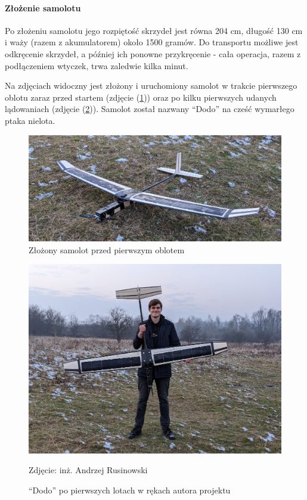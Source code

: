 \documentclass[12pt, a4paper]{article}
\let\oldref\ref
\renewcommand{\ref}[1]{(\oldref{#1})}
\begin{document}
\FloatBarrier
\paragraph{Złożenie samolotu}\mbox{}

Po złożeniu samolotu jego rozpiętość skrzydeł jest równa 204 cm, długość 130 cm i waży (razem z akumulatorem) około 1500 gramów. Do transportu możliwe jest odkręcenie skrzydeł, a później ich ponowne przykręcenie - cała operacja, razem z podłączeniem wtyczek, trwa zaledwie kilka minut. 

Na zdjęciach widoczny jest złożony i uruchomiony samolot w trakcie pierwszego oblotu zaraz przed startem (zdjęcie \ref{fig:gotowy}) oraz po kilku pierwszych udanych lądowaniach (zdjęcie \ref{fig:lataxd}). Samolot został nazwany ``Dodo'' na cześć wymarłego ptaka nielota. 

\begin{figure}[ht]
    \centering
    \includegraphics[width=1\textwidth]{dolotu}
    \caption{Złożony samolot przed pierwszym oblotem}
    \label{fig:gotowy}
\end{figure}

\begin{figure}[ht]
    \centering
    \includegraphics[width=1\textwidth]{budowa16}
    \caption{``Dodo'' po pierwszych lotach w rękach autora projektu}
    \small Zdjęcie: inż. Andrzej Rusinowski
    \label{fig:lataxd}
\end{figure}
\end{document}

